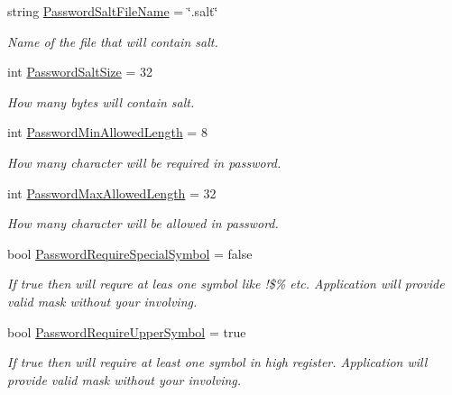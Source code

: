 \begin{DoxyCompactItemize}
string \mbox{\hyperlink{class_authority_controller_1_1_data_1_1_config_a7f2f02b43ede6e98bbe1712f0a5689e2}{Password\+Salt\+File\+Name}} = \char`\"{}.salt\char`\"{}
\begin{DoxyCompactList}\small\item\em Name of the file that will contain salt. \end{DoxyCompactList}\item 
int \mbox{\hyperlink{class_authority_controller_1_1_data_1_1_config_a01c8efd020aa29a69dcc145cd9dd8c1f}{Password\+Salt\+Size}} = 32
\begin{DoxyCompactList}\small\item\em How many bytes will contain salt. \end{DoxyCompactList}\item 
int \mbox{\hyperlink{class_authority_controller_1_1_data_1_1_config_aa78fc021207f80910a576da11c25b46b}{Password\+Min\+Allowed\+Length}} = 8
\begin{DoxyCompactList}\small\item\em How many character will be required in password. \end{DoxyCompactList}\item 
int \mbox{\hyperlink{class_authority_controller_1_1_data_1_1_config_a591fba6f933cffc009424b65f6c20bfb}{Password\+Max\+Allowed\+Length}} = 32
\begin{DoxyCompactList}\small\item\em How many character will be allowed in password. \end{DoxyCompactList}\item 
bool \mbox{\hyperlink{class_authority_controller_1_1_data_1_1_config_ac5aa22d1b95ce7d4a0ceafa5667fde81}{Password\+Require\+Special\+Symbol}} = false
\begin{DoxyCompactList}\small\item\em If true then will requre at leas one symbol like !\$\% etc. Application will provide valid mask without your involving. \end{DoxyCompactList}\item 
bool \mbox{\hyperlink{class_authority_controller_1_1_data_1_1_config_a0c8a26fd109adc0baaf06e13a2afaafd}{Password\+Require\+Upper\+Symbol}} = true
\begin{DoxyCompactList}\small\item\em If true then will require at least one symbol in high register. Application will provide valid mask without your involving. \end{DoxyCompactList}\item 

\end{DoxyCompactItemize}
